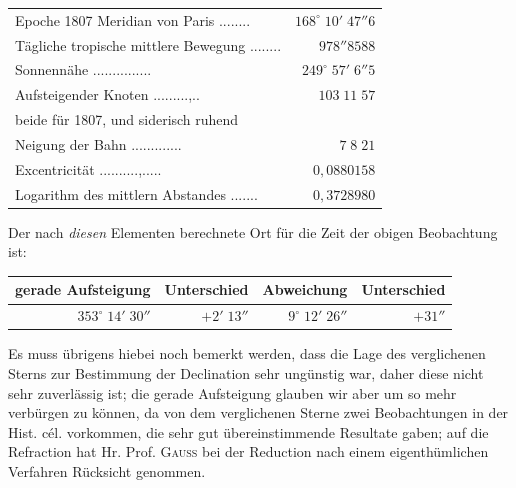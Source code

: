 \begin{center}\fontsize{9}{11}\selectfont\setlength{\tabcolsep}{3pt}\renewcommand{\arraystretch}{1.15}\begin{tabular}{lr}
Epoche 1807 Meridian von Paris .\;.\;.\;.\;.\;.\;.\;.\; & $168^\circ\;10'\;47''6$\\
Tägliche tropische mittlere Bewegung .\;.\;.\;.\;.\;.\;.\;.\; & $978''8588$\\
Sonnennähe .\;.\;.\;.\;.\;.\;.\;.\;.\;.\;.\;.\;.\;.\;.\; & $249^\circ\;57'\;6''5$\\
Aufsteigender Knoten .\;.\;.\;.\;.\;.\;.\;.\;.\;,\;.\;.\; & $103\;11\;57$\\
\multicolumn{2}{l}{\quad beide für 1807, und siderisch ruhend}\\
Neigung der Bahn .\;.\;.\;.\;.\;.\;.\;.\;.\;.\;.\;.\;.\; & $7\;8\;21$\\
Excentricität .\;.\;.\;.\;.\;.\;.\;.\;.\;.\;,\;.\;.\;.\;.\;.\; & $0{,}0880158$\\
Logarithm des mittlern Abstandes .\;.\;.\;\hspace{.5em}.\;.\;.\;.\; & $0{,}3728980$\\
\end{tabular}\end{center}


\par\indent Der nach \emph{diesen} Elementen berechnete Ort für die Zeit der obigen Beobachtung
ist:


\begin{center}\fontsize{10}{12}\selectfont\setlength{\tabcolsep}{3pt}\renewcommand{\arraystretch}{1.15}\begin{tabular}{rrrr}
gerade Aufsteigung & Unterschied & Abweichung & Unterschied\\\hline
$353^\circ\;14'\;30''$ & $+2'\;13''$ & $9^\circ\;12'\;26''$ & $+31''$\\
\end{tabular}\end{center}


\par\indent Es muss übrigens hiebei noch bemerkt werden, dass die Lage des verglichenen Sterns
zur Bestimmung der Declination sehr ungünstig war, daher diese nicht sehr
zuverlässig ist; die gerade Aufsteigung glauben wir aber um so mehr verbürgen zu
können, da von dem verglichenen Sterne zwei Beobachtungen in der Hist. cél.
vorkommen, die sehr gut übereinstimmende Resultate gaben; auf die Refraction hat
Hr. Prof. \textsc{Gauss} bei der Reduction nach einem eigenthümlichen Verfahren Rücksicht
genommen.

